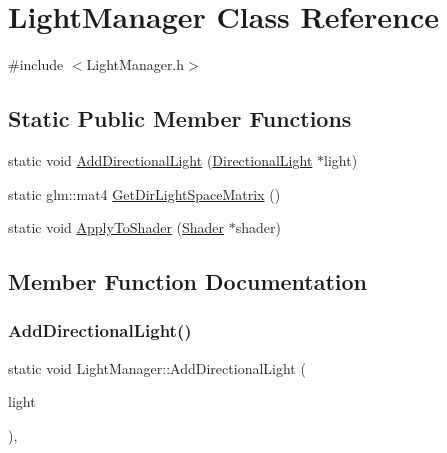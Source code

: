 \hypertarget{class_light_manager}{}\section{Light\+Manager Class Reference}
\label{class_light_manager}


{\ttfamily \#include $<$Light\+Manager.\+h$>$}

\subsection*{Static Public Member Functions}
\begin{DoxyCompactItemize}
\item 
static void \mbox{\hyperlink{class_light_manager_a1002b006844e6b87e173dab3e9a26b17}{Add\+Directional\+Light}} (\mbox{\hyperlink{class_directional_light}{Directional\+Light}} $\ast$light)
\item 
static glm\+::mat4 \mbox{\hyperlink{class_light_manager_a9d24844d79e4e6a62017584ce9f1a154}{Get\+Dir\+Light\+Space\+Matrix}} ()
\item 
static void \mbox{\hyperlink{class_light_manager_a107e825c6ce685f9946ffbf83b6018de}{Apply\+To\+Shader}} (\mbox{\hyperlink{class_shader}{Shader}} $\ast$shader)
\end{DoxyCompactItemize}


\subsection{Member Function Documentation}
\mbox{\label{class_light_manager_a1002b006844e6b87e173dab3e9a26b17}} 
\subsubsection{\texorpdfstring{AddDirectionalLight()}{AddDirectionalLight()}}
{\footnotesize\ttfamily static void Light\+Manager\+::\+Add\+Directional\+Light (\begin{DoxyParamCaption}\item[{\mbox{\hyperlink{class_directional_light}{Directional\+Light}} $\ast$}]{light }\end{DoxyParamCaption})\hspace{0.3cm}{\ttfamily [inline]}, {\ttfamily [static]}}

